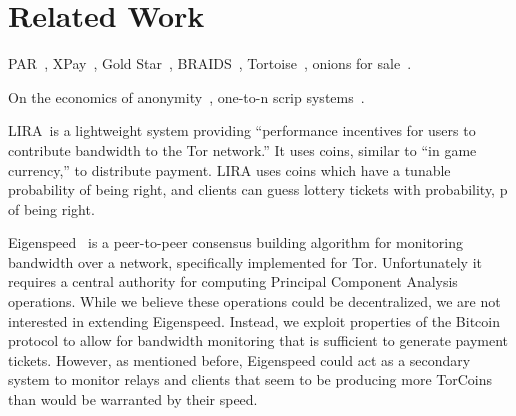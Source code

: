 \section{Related Work} \label{rel}

PAR~\cite{raykova-pet2008}, XPay~\cite{wpes09-xpay}, Gold Star~\cite{incentives-fc10}, BRAIDS~\cite{ccs10-braids}, Tortoise~\cite{acsac11-tortoise}, onions for sale~\cite{johnson2013onions}.

On the economics of anonymity~\cite{Acquisti03onthe}, one-to-n scrip systems~\cite{humbert2011-scrip}.

LIRA~\cite{jansen2013lira}is a lightweight system providing “performance incentives for users to contribute bandwidth to the Tor network.” It uses coins, similar to “in game currency,” to distribute payment. LIRA uses coins which have a tunable probability of being right, and clients can guess lottery tickets with probability, p of being right. 

Eigenspeed~\cite{snader2009eigenspeed} is a peer-to-peer consensus building algorithm for monitoring bandwidth over a network, specifically implemented for Tor. Unfortunately it requires a central authority for computing Principal Component Analysis operations. While we believe these operations could be decentralized, we are not interested in extending Eigenspeed. Instead, we exploit properties of the Bitcoin protocol to allow for bandwidth monitoring that is sufficient to generate payment tickets. However, as mentioned before, Eigenspeed could act as a secondary system to monitor relays and clients that seem to be producing more TorCoins than would be warranted by their speed.  